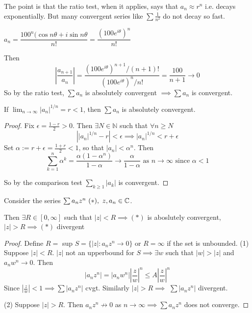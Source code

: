 The point is that the ratio test, when it applies, says that $a_n \approx r^n$ i.e. decays exponentially. But many convergent series like $\sum \frac{1}{n^2}$ do not decay so fast.\\

\begin{example}
$a_n = \dfrac{100^n(\cos n\theta + i\sin n\theta}{n!} = \dfrac{(100e^{i\theta})^n}{n!}$

Then 
\[\left|\frac{a_{n+1}}{a_n}\right| = \frac{(100e^{i\theta})^{n+1}/(n+1)!}{(100e^{i\theta})^{n}/n!} = \frac{100}{n+1} \to 0\]
So by the ratio test, $\sum a_n$ is absolutely convergent $\implies \sum a_n$ is convergent.	
\end{example}



\begin{theorem} 
If $\lim_{n\to \infty} |a_n|^{1/n} = r < 1$, then $\sum a_n$ is absolutely convergent.	
\end{theorem}
\begin{proof}
Fix $\epsilon = \frac{1-r}{2} > 0$. Then $\exists N \in \mathbb{N}$ such that $\forall n \geq N$
\[\left||a_n|^{1/n} - r\right| < \epsilon \implies |a_n|^{1/n} < r + \epsilon\]
Set $\alpha := r + \epsilon = \frac{1 + r}{2} < 1$, so that $|a_n| < \alpha^n$. Then
\[ \sum_{k=1}^n\alpha^k = \frac{\alpha(1-\alpha^n)}{1-\alpha}  \to \frac{\alpha}{1-\alpha} \text{ as } n \to \infty \text{ since } \alpha < 1\]

So by the comparison test $\sum_{k\geq 1} |a_k|$ is convergent.
\end{proof}


\vspace*{5pt}
\begin{theorem}
	Consider the series $\sum a_nz^n ~(*),~ z,a_n \in\mathbb{C}$. 
	
	Then $\exists R \in [0,\infty]$ such that $|z| < R \implies (*)$ is aboslutely convergent, $|z| > R \implies (*)$ divergent
\end{theorem}

\begin{proof}
Define $R =$ sup $S = \{|z| : a_nz^n \to 0\}$	 or $R = \infty$ if the set is unbounded. (1) Suppose $|z| < R$. $|z|$ not an upperbound for $S \implies \exists w$ such that $|w| > |z|$ and $a_nw^n \to 0.$ Then \[|a_nz^n| = |a_nw^n|\left|\frac{z}{w}\right|^n \leq A\left|\frac{z}{w}\right|^n\] Since $\left|\frac{z}{w}\right| < 1 \implies \sum|a_nz^n|$ cvgt. Similarly $|z| >R  \implies$ $\sum |a_nz^n|$ divergent. 

(2) Suppose $|z| > R$. Then $a_nz^n \not\to 0$ as $n \to \infty \implies \sum a_nz^n$ does not converge.
\end{proof}

